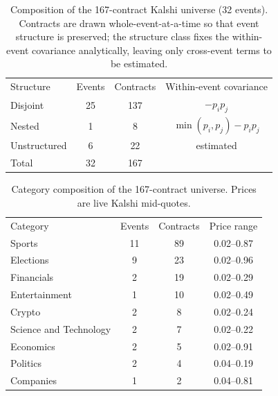 
\begin{table}[b]
\caption{\label{tab:contracts}Composition of the 167-contract Kalshi universe (32 events).  Contracts are drawn whole-event-at-a-time so that event structure is preserved; the structure class fixes the within-event covariance analytically, leaving only cross-event terms to be estimated.}
\begin{ruledtabular}
\begin{tabular}{lccc}
Structure & Events & Contracts & Within-event covariance \\
\colrule
Disjoint & 25 & 137 & $-p_i p_j$ \\
Nested & 1 & 8 & $\min(p_i,p_j)-p_i p_j$ \\
Unstructured & 6 & 22 & estimated \\
\colrule
Total & 32 & 167 & \\
\end{tabular}
\end{ruledtabular}
\end{table}


\begin{table}[b]
\caption{\label{tab:categories}Category composition of the 167-contract universe.  Prices are live Kalshi mid-quotes.}
\begin{ruledtabular}
\begin{tabular}{lccc}
Category & Events & Contracts & Price range \\
\colrule
Sports & 11 & 89 & 0.02--0.87 \\
Elections & 9 & 23 & 0.02--0.96 \\
Financials & 2 & 19 & 0.02--0.29 \\
Entertainment & 1 & 10 & 0.02--0.49 \\
Crypto & 2 & 8 & 0.02--0.24 \\
Science and Technology & 2 & 7 & 0.02--0.22 \\
Economics & 2 & 5 & 0.02--0.91 \\
Politics & 2 & 4 & 0.04--0.19 \\
Companies & 1 & 2 & 0.04--0.81 \\
\end{tabular}
\end{ruledtabular}
\end{table}


